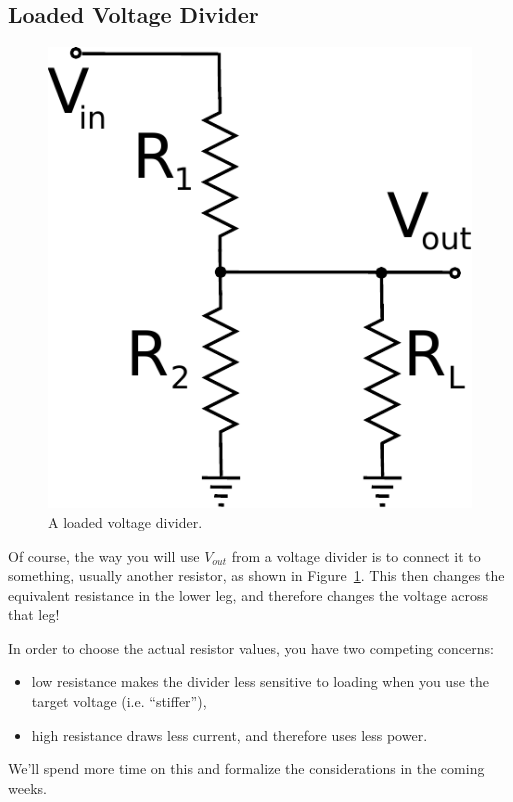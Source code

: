 \documentclass{article}
\begin{document}
\subsection{Loaded Voltage Divider}
\begin{figure}
\centering
\includegraphics[height=0.2\textheight]{pics/loaded_voltage_divider.pdf}
\caption{A loaded voltage divider.}
\label{fig:loaded_voltage_divider}
\end{figure}
Of course, the way you will use $V_{out}$ from a voltage divider is to connect it to something, usually another resistor, as shown in Figure~\ref{fig:loaded_voltage_divider}. This then changes the equivalent resistance in the lower leg, and therefore changes the voltage across that leg!

In order to choose the actual resistor values, you have two competing concerns:
\begin{itemize}
\item low resistance makes the divider less sensitive to loading when you use the target voltage (i.e. ``stiffer''),
\item high resistance draws less current, and therefore uses less power.
\end{itemize}
We'll spend more time on this and formalize the considerations in the coming weeks. 
\end{document}
